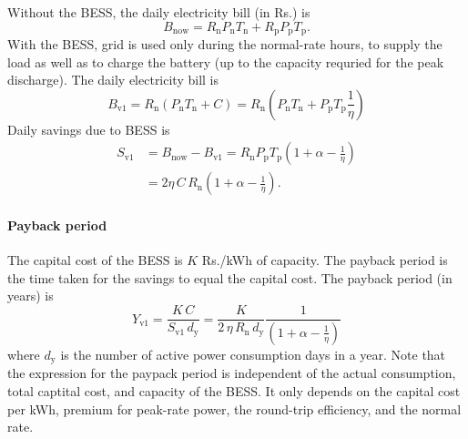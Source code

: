 \documentclass[a4paper]{article}
\begin{document}
Without the BESS, the daily electricity bill (in Rs.) is
\begin{equation}
    B_{\text{now}} = 
    R_{\text{n}} P_{\text{n}} T_{\text{n}}  +
    R_{\text{p}} P_{\text{p}} T_{\text{p}} . 
\end{equation}
With the BESS, grid is used only during the normal-rate hours, to supply the load
as well as to charge the battery (up to the capacity requried for the peak discharge). 
The daily electricity bill is
\begin{equation}
    B_{\text{v1}} = 
    R_\text{n} \left(P_{\text{n}}  T_{\text{n}}  +  
     C \right)
    = 
    R_\text{n} \left( P_{\text{n}} T_{\text{n}} +  
    P_{\text{p}} T_{\text{p}} \frac{1}{\eta} \right)
\end{equation}
Daily savings due to BESS is
\begin{align}
    \label{eq:sv1}
    S_\text{v1} & = B_{\text{now}} - B_{\text{v1}} = 
    R_{\text{n}} P_{\text{p}} T_{\text{p}} \left(1 + \alpha - \frac{1}{\eta}\right) \\
    & =  2 \eta \, C \,  R_{\text{n}} \left(1 + \alpha - \frac{1}{\eta}\right).
\end{align}



\paragraph{Payback period} The capital cost of the BESS is $K$ Rs./kWh
of capacity. The payback period is the time taken for the savings to
equal the capital cost. The payback period (in years) is
\begin{equation}
    \label{eq:pb1}
    Y_\text{v1} = \frac{K \, C}{S_\text{v1} \, d_\text{y}} 
    = \frac{K}{2 \, \eta \, R_\text{n} \, d_\text{y}} \frac{1}{\left(1 + \alpha 
    - \frac{1}{\eta}\right)}
\end{equation} 
where $d_\text{y}$ is the number of active power consumption days in a year. 
Note that the expression for the paypack period is independent of the
actual consumption, total captital cost, and capacity of the BESS. It
only depends on the capital cost per kWh, premium for peak-rate power,
the round-trip efficiency, and the normal rate.
\end{document}
